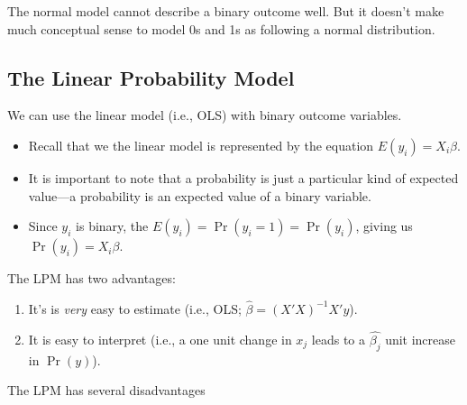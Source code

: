 \documentclass[
]{book}
\providecommand{\tightlist}{%
  \setlength{\itemsep}{0pt}\setlength{\parskip}{0pt}}
\begin{document}
The normal model cannot describe a binary outcome well. But it doesn't make much conceptual sense to model 0s and 1s as following a normal distribution.

\hypertarget{the-linear-probability-model}{%
\subsection{The Linear Probability Model}\label{the-linear-probability-model}}

We can use the linear model (i.e., OLS) with binary outcome variables.

\begin{itemize}
\tightlist
\item
  Recall that we the linear model is represented by the equation \(E(y_i) = X_i\beta\).
\item
  It is important to note that a probability is just a particular kind of expected value---a probability is an expected value of a binary variable.
\item
  Since \(y_i\) is binary, the \(E(y_i) = \Pr(y_i = 1) = \Pr(y_i)\), giving us \(\Pr(y_i) = X_i\beta\).
\end{itemize}

The LPM has two advantages:

\begin{enumerate}
\def\labelenumi{\arabic{enumi}.}
\tightlist
\item
  It's is \emph{very} easy to estimate (i.e., OLS; \(\hat{\beta} = (X'X)^{-1}X'y\)).
\item
  It is easy to interpret (i.e., a one unit change in \(x_j\) leads to a \(\hat{\beta_j}\) unit increase in \(\Pr(y)\)).
\end{enumerate}

The LPM has several disadvantages
\end{document}
